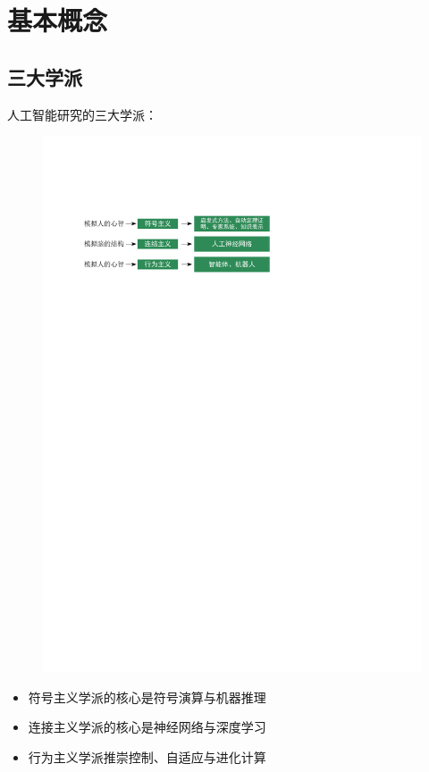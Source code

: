 \section{基本概念}
\subsection{三大学派}
人工智能研究的三大学派：
\begin{figure}[htbp]
    \centering
    \includegraphics{image/3大学派.pdf}
\end{figure}
\begin{itemize}
    \item 符号主义学派的核心是符号演算与机器推理
    \item 连接主义学派的核心是神经网络与深度学习
    \item 行为主义学派推崇控制、自适应与进化计算
\end{itemize}

